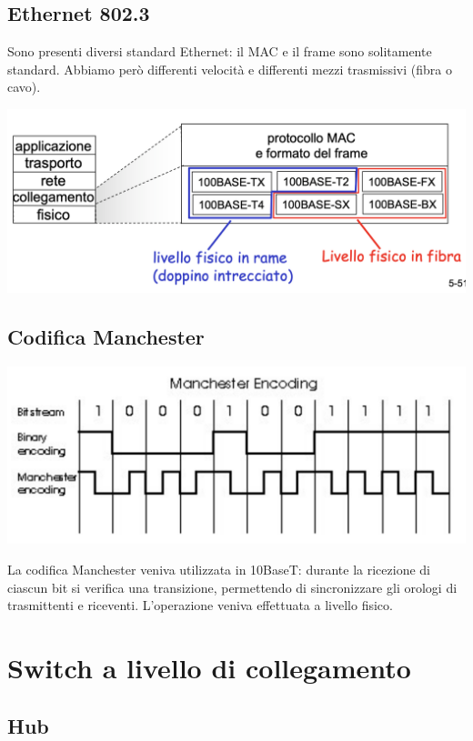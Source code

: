 \documentclass{report}
\begin{document}
\hypertarget{header-n194}{%
\subsection{Ethernet 802.3}\label{header-n194}}

Sono presenti diversi standard Ethernet: il MAC e il frame sono
solitamente standard. Abbiamo però differenti velocità e differenti
mezzi trasmissivi (fibra o cavo).

\begin{center}
		\includegraphics[width=0.7\linewidth]{fisico}
	\end{center}

\hypertarget{header-n197}{%
\subsection{Codifica Manchester}\label{header-n197}}

\begin{center}
		\includegraphics[width=0.7\linewidth]{manchester}
	\end{center}

La codifica Manchester veniva utilizzata in 10BaseT: durante la
ricezione di ciascun bit si verifica una transizione, permettendo di
sincronizzare gli orologi di trasmittenti e riceventi. L'operazione
veniva effettuata a livello fisico.

\hypertarget{header-n200}{%
\section{Switch a livello di collegamento}\label{header-n200}}

\hypertarget{header-n201}{%
\subsection{Hub}\label{header-n201}}
\end{document}
